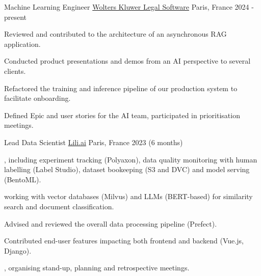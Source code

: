 

\begin{cventries}

  \cventry
    {Machine Learning Engineer} %
    {\href{https://www.linkedin.com/company/wolters-kluwer-legal-software}{Wolters Kluwer Legal Software}} %
    {Paris, France} %
    {2024 - present} %
    {
      \begin{cvitems} %
        \item {Reviewed and contributed to the architecture of an asynchronous RAG application.}
        \item {Conducted product presentations and demos from an AI perspective to several clients.}
        \item {Refactored the training and inference pipeline of our production system to facilitate onboarding.}
        \item {Defined Epic and user stories for the AI team, participated in prioritisation meetings.}
      \end{cvitems}
    }

  \cventry
    {Lead Data Scientist} %
    {\href{https://lili.ai/}{Lili.ai}} %
    {Paris, France} %
    {2023 (6 months)} %
    {
      \begin{cvitems} %
        \item {, including experiment tracking (Polyaxon), data quality monitoring with human labelling (Label Studio), dataset bookeeping (S3 and DVC) and model serving (BentoML).}
        \item { working with vector databases (Milvus) and LLMs (BERT-based) for similarity search and document classification.}
        \item {Advised and reviewed the overall data processing pipeline (Prefect).}
        \item {Contributed end-user features impacting both frontend and backend (Vue.js, Django).}
        \item {, organising stand-up, planning and retrospective meetings.}
      \end{cvitems}
    }

\end{cventries}
